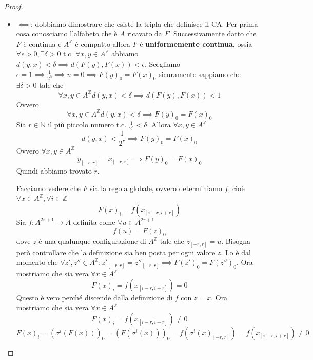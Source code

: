 \begin{teorema} 
\begin{proof}
\begin{itemize}
                  Successivamente dimostriamo $F\circ \sigma = \sigma \circ F\implies F(\sigma(x)) = \sigma(F(x)), \forall x \in A^\mathbb{Z}$.
                  l'uguaglianza precedente può essere riscritta come $\forall x \in A^\mathbb{Z}, \forall i \in \mathbb{Z}, (F(\sigma(x)))_i =(\sigma(F(x)))_i$.
                  Possiamo notare che
                  $$(F(\sigma(x)))_i = f(\sigma(x)_{[i-r,i+r]})=f(x_{[i-r+1,i+r+1]})$$
                  Inoltre
                  $$(\sigma(F(x)))_i =F(x)_{i+1} =f(x)_{[i+1-r,i+1+r]}$$
                  Abbiamo dimostrato che commutano.
            \item $\impliedby$: dobbiamo dimostrare che esiste la tripla che definisce il CA.
                  Per prima cosa conosciamo l'alfabeto che è $A$ ricavato da $F$. Successivamente
                  datto che $F$ è continua e $A^\mathbb{Z}$ è compatto allora $F$ è \textbf{uniformemente
                      continua}, ossia $\forall\epsilon >0,\exists \delta > 0 \text{ t.c. } \forall x,y \in A^\mathbb{Z}$
                  abbiamo $d(y,x)<\delta \implies d(F(y), F(x)) < \epsilon$. Scegliamo $\epsilon = 1\implies \frac{1}{2^0}\implies n=0\implies F(y)_0= F(x)_0$
                  sicuramente sappiamo che $\exists \delta >0$ tale che $$\forall x,y \in A^\mathbb{Z} d(y,x)<\delta \implies d(F(y), F(x)) < 1$$
                  Ovvero $$\forall x,y \in A^\mathbb{Z} d(y,x)<\delta \implies F(y)_0= F(x)_0$$
                  Sia $r\in \mathbb{N}$ il più piccolo numero t.c. $\frac{1}{2^r}<\delta$.
                  Allora $\forall x,y \in A^\mathbb{Z}$
                  $$d(y,x)<\frac{1}{2^r} \implies F(y)_0= F(x)_0$$
                  Ovvero $\forall x,y \in A^\mathbb{Z}$
                  $$y_{[-r,r]} =x_{[-r,r]}\implies F(y)_0= F(x)_0$$
                  Quindi abbiamo trovato $r$.

                  Facciamo vedere che $F$ sia la regola globale, ovvero determiniamo $f$, cioè
                  $\forall x\in A^\mathbb{Z},\forall i\in\mathbb{Z}$
                  $$F(x)_i = f(x_{[i-r,i+r]})$$
                  Sia $f: A^{2r+1}\rightarrow A$ definita come $\forall u \in A^{2r+1}$
                  $$f(u) = F(z)_0$$ dove $z$ è una qualunque configurazione di
                  $A^\mathbb{Z}$ tale che $z_{[-r,r]} = u$. Bisogna però controllare che
                  la definizione sia ben posta per ogni valore $z$. Lo è dal momento che
                  $\forall z',z''\in A^\mathbb{Z}: z'_{[-r,r]} =  z''_{[-r,r]}\implies F(z')_0 = F(z'')_0$.
                  Ora mostriamo che sia vera $\forall x\in A^\mathbb{Z}$
                  $$F(x)_i = f(x_{[i-r,i+r]}) = 0$$
                  Questo è vero perché discende dalla definizione di $f$ con $z = x$.
                  Ora mostriamo che sia vera $\forall x\in A^\mathbb{Z}$
                  $$F(x)_i = f(x_{[i-r,i+r]})\ne 0$$
                  $$F(x)_i = (\sigma^i(F(x)))_0=(F(\sigma^i(x)))_0=f(\sigma^i(x)_{[-r,r]}) = f(x_{[i-r,i+r]}) \ne 0$$
        \end{itemize}
    \end{proof}
\end{teorema}

